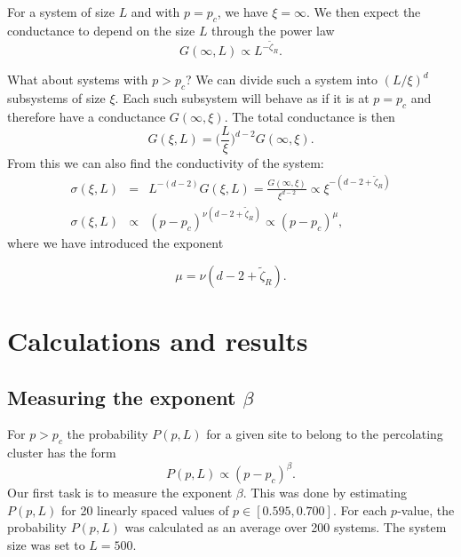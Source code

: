 \documentclass[12pt]{article}
\newcommand{\beq}{\begin{equation}}
\newcommand{\eeq}{\end{equation}}
\newcommand{\bdi}{\begin{displaymath}}
\newcommand{\edi}{\end{displaymath}}
\begin{document}
For a system of size $L$ and with $p=p_c$, we have $\xi = \infty$. We then expect the conductance to depend on the size $L$ through the power law
\beq
\label{eq:G}
G(\infty,L) \propto L^{-\tilde\zeta_R}.
\eeq

What about systems with $p>p_c$? We can divide such a system into $(L/\xi)^d$ subsystems of size $\xi$. Each such subsystem will behave as if it is at $p=p_c$ and therefore have a
conductance $G(\infty, \xi)$. The total conductance is then
\bdi
G(\xi,L) = \Big(\frac{L}{\xi}\Big)^{d-2} G(\infty,\xi).
\edi
From this we can also find the conductivity of the system:
\begin{eqnarray}
\sigma(\xi,L) &=& L^{-(d-2)}G(\xi,L) = \frac{G(\infty,\xi)}{\xi^{d-2}} \propto \xi^{-(d-2+\tilde\zeta_R)} \nonumber\\
\sigma(\xi,L) &\propto& (p-p_c)^{\nu(d-2+\tilde\zeta_R)} \propto (p-p_c)^\mu, \label{eq:sigma}
\end{eqnarray}
where we have introduced the exponent

\beq
\label{eq:mu}
\mu = \nu(d-2+\tilde\zeta_R).
\eeq








\section*{Calculations and results}
\subsection*{Measuring the exponent $\beta$}
For $p>p_c$ the probability $P(p,L)$ for a given site to belong to the percolating cluster has the form
\beq
\label{eq:beta}
P(p,L) \propto (p-p_c)^\beta.
\eeq
Our first task is to measure the exponent $\beta$. This was done by estimating $P(p,L)$ for 20 linearly spaced values of $p\in[0.595, 0.700]$. For each $p$-value, the probability $P(p,L)$ was calculated
as an average over 200 systems. The system size was set to $L=500$.
\end{document}
